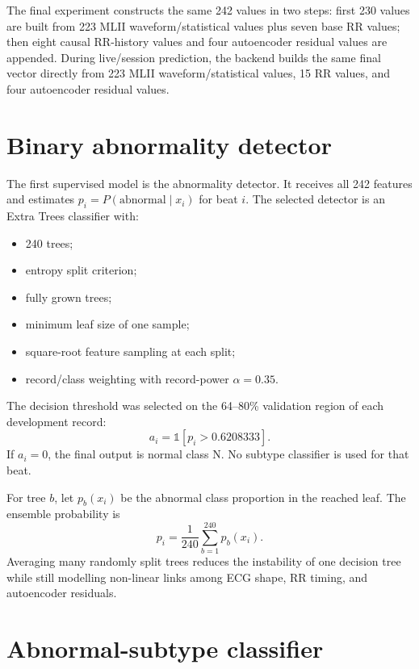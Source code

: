 The final experiment constructs the same 242 values in two steps: first 230
values are built from 223 MLII waveform/statistical values plus seven base RR
values; then eight causal RR-history values and four autoencoder residual
values are appended. During live/session prediction, the backend builds the
same final vector directly from 223 MLII waveform/statistical values, 15 RR
values, and four autoencoder residual values.

\section{Binary abnormality detector}

The first supervised model is the abnormality detector. It receives all 242
features and estimates $p_i=P(\mathrm{abnormal}\mid x_i)$ for beat $i$. The
selected detector is an Extra Trees classifier with:
\begin{itemize}
\item 240 trees;
\item entropy split criterion;
\item fully grown trees;
\item minimum leaf size of one sample;
\item square-root feature sampling at each split;
\item record/class weighting with record-power $\alpha=0.35$.
\end{itemize}
The decision threshold was selected on the 64--80\% validation region of each
development record:
\begin{equation}
 a_i=\mathbb{1}[p_i>0.6208333].
\end{equation}
If $a_i=0$, the final output is normal class N. No subtype classifier is used
for that beat.

For tree $b$, let $p_b(x_i)$ be the abnormal class proportion in the reached
leaf. The ensemble probability is
\begin{equation}
 p_i=\frac{1}{240}\sum_{b=1}^{240}p_b(x_i).
\end{equation}
Averaging many randomly split trees reduces the instability of one decision
tree while still modelling non-linear links among ECG shape, RR timing, and
autoencoder residuals.

\section{Abnormal-subtype classifier}

